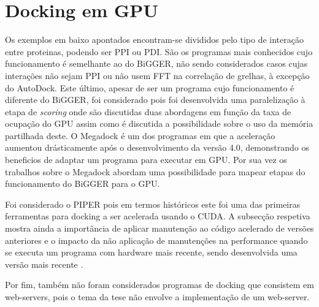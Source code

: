 \section{Docking em GPU}
\label{gpus1}
Os exemplos em baixo apontados encontram-se divididos pelo tipo de interação entre proteinas, podendo ser PPI ou PDI. São os programas mais conhecidos cujo funcionamento é semelhante ao do BiGGER, não sendo considerados casos cujas interações não sejam PPI ou não usem FFT na correlação de grelhas, à excepção do AutoDock. Este último, apesar de ser um programa cujo funcionamento é diferente do BiGGER, foi considerado pois foi desenvolvida uma paralelização à etapa de \textit{scoring} \cite{autodockCuda} onde são discutidas duas abordagens em função da taxa de ocupação do GPU assim como é discutida a possibilidade sobre o uso da memória partilhada deste. O Megadock é um dos programas em que a aceleração aumentou drásticamente após o desenvolvimento da versão 4.0, demonstrando os beneficios de adaptar um programa para executar em GPU. Por sua vez os trabalhos sobre o Megadock \cite{shimoda2015protein} \cite{megadock40} abordam uma possibilidade para mapear etapas do funcionamento do BiGGER para o GPU.\par Foi considerado o PIPER pois em termos históricos este foi uma das primeiras ferramentas para docking a ser acelerada usando o CUDA\cite{piper2009gpu}. A subsecção respetiva mostra ainda a importância de aplicar manutenção ao código acelerado de versões anteriores e o impacto da não aplicação de manutenções na performance quando se executa um programa com hardware mais recente, sendo desenvolvida uma versão mais recente \cite{piper2014gpu}.\par
Por fim, também não foram considerados programas de docking que consistem em web-servers, pois o tema da tese não envolve a implementação de um web-server.

